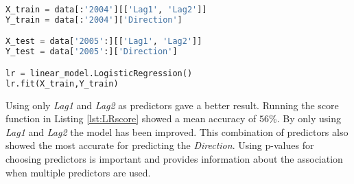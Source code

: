 \begin{lstlisting}[language=Python, label=lst:OnlyLag1Lag2, caption=Logistic regression using only Lag1 and Lag2 as predictors]
X_train = data[:'2004'][['Lag1', 'Lag2']]
Y_train = data[:'2004']['Direction']

X_test = data['2005':][['Lag1', 'Lag2']]
Y_test = data['2005':]['Direction']

lr = linear_model.LogisticRegression()
lr.fit(X_train,Y_train)
\end{lstlisting}

Using only \emph{Lag1} and \emph{Lag2} as predictors gave a better result. Running the score function in Listing \ref{lst:LRscore} showed a mean accuracy of $56\%$. By only using \emph{Lag1} and \emph{Lag2} the model has been improved. This combination of predictors also showed the most accurate for predicting the \emph{Direction}. Using p-values for choosing predictors is important and provides information about the association when multiple predictors  are used.







